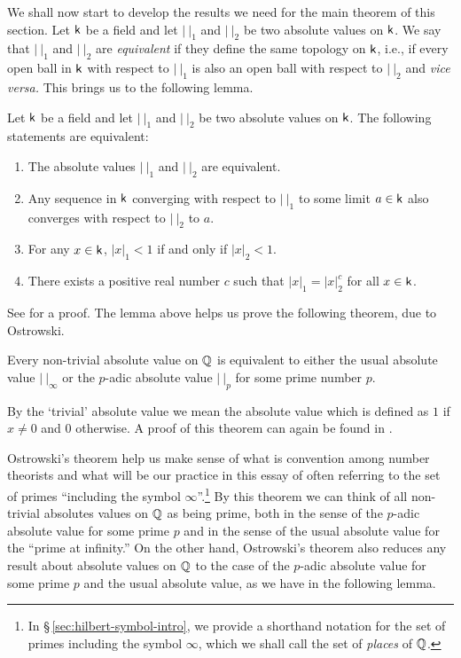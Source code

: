 We shall now start to develop the results we need for the main theorem of this
section. Let \(\mathsf{k}\) be a field and let \(|\ |_1\) and \(|\ |_2\) be two
absolute values on \(\mathsf{k}\). We say that \(|\ |_1\) and \(|\ |_2\) are
\emph{equivalent} if they define the same topology on \(\mathsf{k}\), i.e., if every
open ball in \(\mathsf{k}\) with respect to \(|\ |_1\) is also an open ball with
respect to \(|\ |_2\) and \emph{vice versa.} This brings us to the following
lemma.

\begin{lemma}
    Let \(\mathsf{k}\) be a field and let \(|\ |_1\) and \(|\ |_2\) be two absolute
    values on \(\mathsf{k}\). The following statements are equivalent:

    \smallskip

    \begin{enumerate}[nosep, label=(\alph*)]
        \item The absolute values \(|\ |_1\) and \(|\ |_2\) are equivalent.
        \item Any sequence in \(\mathsf{k}\) converging with respect to \(|\ |_1\)
        to some limit \(a \in \mathsf{k}\) also converges with respect to \(|\ |_2\)
        to \(a\).
        \item For any \(x \in \mathsf{k}\), \(|x|_1 < 1\) if and only if \(|x|_2 <
        1\).
        \item There exists a positive real number \(c\) such that \(|x|_1 =
        |x|_2^c\) for all \(x \in \mathsf{k}\).
    \end{enumerate}
\end{lemma}

See \cite[pp.~54-56]{gouvea1997p} for a proof. The lemma above helps us prove
the following theorem, due to Ostrowski.

\begin{theoremx}[Ostrowski]\label{thm:ostrowski} Every non-trivial absolute
    value on \(\mathbb{Q}\) is equivalent to either the usual absolute value
    \(|\ |_{\infty}\) or the \(p\)-adic absolute value \(|\ |_p\) for some prime
    number \(p\).
\end{theoremx}

By the `trivial' absolute value we mean the absolute value which is defined as
\(1\) if \(x \neq 0\) and \(0\) otherwise. A proof of this theorem can again be
found in \cite[pp.~56--59]{gouvea1997p}.

Ostrowski's theorem help us make sense of what is convention among number
theorists and what will be our practice in this essay of often referring to the
set of primes ``including the symbol \(\infty\)''.\footnote{In
\S\,\ref{sec:hilbert-symbol-intro}, we provide a shorthand notation for the set
of primes including the symbol \(\infty\), which we shall call the set of
\emph{places} of \(\mathbb{Q}\).} By this theorem we can think of all
non-trivial absolutes values on \(\mathbb{Q}\) as being prime, both in the sense
of the \(p\)-adic absolute value for some prime \(p\) and in the sense of the
usual absolute value for the ``prime at infinity.'' On the other hand,
Ostrowski's theorem also reduces any result about absolute values on
\(\mathbb{Q}\) to the case of the \(p\)-adic absolute value for some prime \(p\)
and the usual absolute value, as we have in the following lemma.

